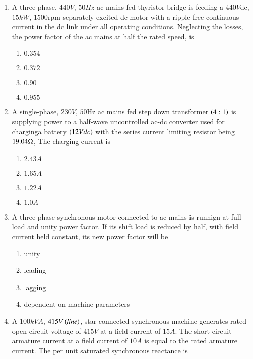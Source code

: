 \documentclass[journal]{IEEEtran}
\begin{document}
\begin{enumerate}
\begin{multicols}{2}
\begin{enumerate}
    \item $5Hz$
    \item $4Hz$
    \item $2Hz$
\end{enumerate}    
\end{multicols}
\item A three-phase, $440V$, $50Hz$ ac mains fed thyristor bridge is feeding a $440 V$dc, $15kW$, $1500$rpm separately excited dc motor with a ripple free continuous current in the dc link under all operating conditions. Neglecting the losses, the power factor of the ac mains at half the rated speed, is 
\begin{multicols}{2}
\begin{enumerate}
    \item $0.354$
    \item $0.372$
    \item $0.90$
    \item $0.955$
\end{enumerate}    
\end{multicols}
\item A single-phase, $230V$, $50$Hz ac mains fed step down transformer $\left(4:1\right)$ is supplying power to a half-wave uncontrolled ac-dc converter used for charginga battery $\left(12Vdc\right)$ with the series current limiting resistor being $19.04\ohm$, The charging current is
\begin{multicols}{2}
\begin{enumerate}
    \item $2.43A$
    \item $1.65A$
    \item $1.22A$
    \item $1.0A$
\end{enumerate}    
\end{multicols}
\item A three-phase synchronous motor connected to ac mains is runnign at full load and unity power factor. If its shift load is reduced by half, with field current held constant, its new power factor will be 
\begin{enumerate}
    \item unity
    \item leading
    \item lagging
    \item dependent on machine parameters
\end{enumerate}    
\item A $100kVA$, $415V\left(line\right)$, star-connected synchronous machine generates rated open circuit voltage of $415V$ at a field current of $15A$. The short circuit armature current at a field current of $10A$ is equal to the rated armature current. The per unit saturated synchronous reactance is 

\end{enumerate}
\end{document}
